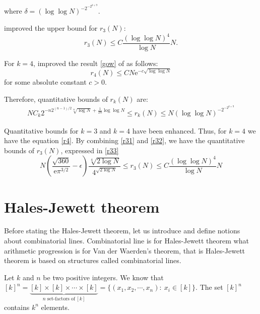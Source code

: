\begin{description}
where $\delta= \left(\log \log N\right)^{-2^{-2^{k+9}}}.$ 

\cite{bloom2016quantitative} improved the upper bound for $r_3(N):$
\begin{equation}
r_3(N) \leq C \frac{(\log \log N)^4}{\log N} N. \label{r32}
\end{equation}

For $k=4$, \cite{green2006new} improved the result \eqref{gow} of \cite{gowers2001new} as follows:
\begin{equation}
r_4(N) \leq C N\mathrm{e}^{-c\sqrt{\log \log N}} \label{r4}
\end{equation}
for some absolute constant $c > 0.$
\end{description}

Therefore, quantitative bounds of $r_k(N)$ are:
\begin{align}
NC_k 2^{-n2^{(n-1)/2} \sqrt[n]{\log N} +\frac{1}{2n} \log \log N } \leq r_k(N) \leq N\left(\log \log N\right)^{-2^{-2^{k+9}}}
\end{align}

Quantitative bounds for  $k=3$  and $k=4$ have been enhanced. Thus, for $k=4$ we have the equation \eqref{r4}. By combining  \eqref{r31} and \eqref{r32}, we have the quantitative bounds of $r_3(N)$, expressed in \eqref{r33}
\begin{equation}
N \left( \frac{\sqrt{360}}{\mathrm{e}\pi^{3/2}}-\epsilon \right) \frac{\sqrt[4]{2\log N}}{4^{\sqrt{2\log N}}} \leq r_3(N) \leq C \frac{(\log \log N)^4}{\log N} N  \label{r33}
\end{equation}

\section{Hales-Jewett theorem}

Before stating the Hales-Jewett theorem, let us introduce and define notions about combinatorial lines.  Combinatorial line is for Hales-Jewett theorem what arithmetic progression is for Van der Waerden's theorem, that is Hales-Jewett theorem is based on structures called combinatorial lines.

Let $k$ and $n$  be two positive integers. We know that $[k]^n= \underbrace{[k] \times [k] \times \cdots \times [k]}_{n \text{ set-factors  of}\  [k]}=\{(x_1,x_2,\cdots, x_n):\ x_i \in [k] \}.$ The set $[k]^n$ contains $k^n$ elements.

